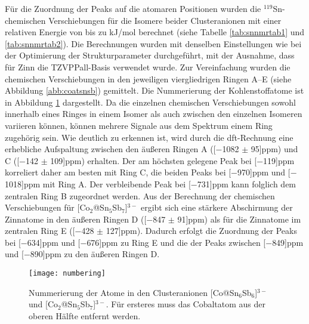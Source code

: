 Für die Zuordnung der Peaks auf die atomaren Positionen wurden die $^{119}$Sn-chemischen Verschiebungen für die Isomere beider Clusteranionen mit einer relativen Energie von bis zu \unit[10]{kJ/mol} berechnet (siehe Tabelle \ref{tab:snnmrtab1} und \ref{tab:snnmrtab2}). Die Berechnungen wurden mit denselben Einstellungen wie bei der Optimierung der Strukturparameter durchgeführt, mit der Ausnahme, dass für Zinn die TZVPPall-Basis\supercite{ahlrichs2000contracted} verwendet wurde. Zur Vereinfachung wurden die chemischen Verschiebungen in den jeweiligen viergliedrigen Ringen A--E (siehe Abbildung \ref{abb:coatsnsb}) gemittelt. Die Nummerierung der Kohlenstoffatome ist in Abbildung \ref{abb:numbering} dargestellt. Da die einzelnen chemischen Verschiebungen sowohl innerhalb eines Ringes in einem Isomer als auch zwischen den einzelnen Isomeren variieren können, können mehrere Signale aus dem Spektrum einem Ring zugehörig sein. Wie deutlich zu erkennen ist, wird durch die \ac{dft}-Rechnung eine erhebliche Aufspaltung zwischen den äußeren Ringen A (\unit[$-$1082 $\pm$ 95]{ppm}) und C (\unit[$-$142 $\pm$ 109]{ppm}) erhalten. Der am höchsten gelegene Peak bei \unit[$-$119]{ppm} korreliert daher am besten mit Ring C, die beiden Peaks bei \unit[$-$970]{ppm} und \unit[$-$1018]{ppm} mit Ring A. Der verbleibende Peak bei \unit[$-$731]{ppm} kann folglich dem zentralen Ring B zugeordnet werden. Aus der Berechnung der chemischen Verschiebungen für [Co$_2$@Sn$_5$Sb$_7$]$^{3-}$ ergibt sich eine stärkere Abschirmung der Zinnatome in den äußeren Ringen D (\unit[$-$847 $\pm$ 91]{ppm}) als für die Zinnatome im zentralen Ring E (\unit[$-$428 $\pm$ 127]{ppm}). Dadurch erfolgt die Zuordnung der Peaks bei \unit[$-$634]{ppm} und \unit[$-$676]{ppm} zu Ring E und die der Peaks zwischen \unit[$-$849]{ppm} und \unit[$-$890]{ppm} zu den äußeren Ringen D. 
\vspace{20pt}
\begin{figure}[ht!]
	\centering
	\texttt{[image: numbering]}
	\captionsetup{figurewithin = chapter}
	\captionsetup{font=small, labelfont=bf}\caption[Nummerierung der Atome in {[Co@Sn$_6$Sb$_6$]$^{3-}$} und {[Co$_2$@Sn$_5$Sb$_7$]$^{3-}$} ]{Nummerierung der Atome in den Clusteranionen [Co@Sn$_6$Sb$_6$]$^{3-}$ und [Co$_2$@Sn$_5$Sb$_7$]$^{3-}$. Für ersteres muss das Cobaltatom aus der oberen Hälfte entfernt werden.}
\label{abb:numbering}
\end{figure}
\vfill
\newpage

